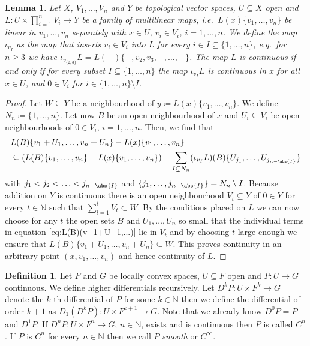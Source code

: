 \documentclass[12pt,a4paper]{article}
\theoremstyle{plain}
\newtheorem{lemma}[theorem]{Lemma}
\theoremstyle{definition}
\newtheorem{definition}[theorem]{Definition}
\newcommand{\N}{\mathbb{N}}
\begin{document}
\begin{lemma}
\label{Lemma:ContFamOfMultLin}
Let $X$, $V_1,\ldots,V_n$ and $Y$ be topological vector spaces, $U\subseteq X$ open and $L:U\times \prod_{i=1}^nV_i\to Y$ be a family of multilinear maps, i.e.~$L(x)\{v_1,\ldots,v_n\}$ be linear in $v_1,\ldots,v_n$ separately with $x\in U$, $v_i\in V_i$, $i=1,\ldots,n$.
We define the map $\iota_{v_I}$ as the map that inserts $v_i\in V_i$ into $L$ for every $i\in I\subseteq \{1,\ldots,n\}$, e.g.~for $n\geq 3$ we have $\iota_{v_{\{2,3\}}}L=L(-)\{-,v_2,v_3,-,\ldots,-\}$.  
The map $L$ is continuous if and only if for every subset $I\subseteq \{1,\ldots,n\}$ the map $\iota_{v_I}L$ is continuous in $x$ for all $x\in U$, and $0\in V_i$ for $i\in \{1,\ldots,n\}\setminus I$.
\end{lemma}
\begin{proof}
Let $W\subseteq Y$ be a neighbourhood of $y\coloneqq L(x)\{v_1,\ldots,v_n\}$. We define 
$N_n\coloneqq \{1,\ldots,n\}$. 
Let now $B$ be an open neighbourhood of $x$ and $U_i\subseteq V_i$ be open neighbourhoods of $0\in V_i$, $i=1,\ldots,n$. Then, we find that
\begin{align}
\label{eq:L(B)(v_1+U_1,...)}
\begin{split}
    &L(B)\{v_1+U_1,\ldots,v_n+U_n\}-L(x)\{v_1,\ldots,v_n\}\\
    &\subseteq (L(B)\{v_1,\ldots,v_n\}-L(x)\{v_1,\ldots,v_n\})
    +\sum_{ I\subsetneq N_n}(\iota_{v_I}L)(B)\{U_{j_1},\ldots,U_{j_{n-\abs{I}}}\}
\end{split}
\end{align}
with $j_1<j_2<\ldots<j_{n-\abs{I}}$ and $\{j_1,\ldots,j_{n-\abs{I}}\}=N_n\setminus I$. Because addition on $Y$ is continuous there is an open neighbourhood $V_t\subseteq Y$ of $0\in Y$ for every $t\in \N$ such that $\sum_{l=1}^t V_t\subset W$. By the conditions placed on $L$ we can now choose for any $t$ the open sets $B$ and $U_1,\ldots,U_n$ so small that the individual terms in equation
\eqref{eq:L(B)(v_1+U_1,...)}
lie in $V_t$ and by choosing $t$ large enough we ensure that $L(B)\{v_1+U_1,\ldots,v_n+U_n\}\subseteq W$. This proves continuity in an arbitrary point $(x,v_1,\ldots,v_n)$ and hence continuity of $L$.
\end{proof}

\begin{definition}
\label{Def:HigherDiffs}
Let $F$ and $G$ be locally convex spaces, $U\subseteq F$ open and $P:U\to G$ continuous. We define higher differentials recursively. Let $D^kP:U\times F^k\to G$ denote the $k$-th differential of $P$ for some $k\in \N$ then we define the differential of order $k+1$ as $D_1(D^kP):U\times F^{k+1}\to G$. Note that we already know $D^0P=P$ and $D^1P$. If $D^nP:U\times F^n\to G$, $n\in \N$, exists and is continuous then $P$ is called $C^n$. If $P$ is $C^n$ for every $n\in \N$ then we call $P$ \textit{smooth} or $C^\infty$.
\end{definition}
\end{document}
